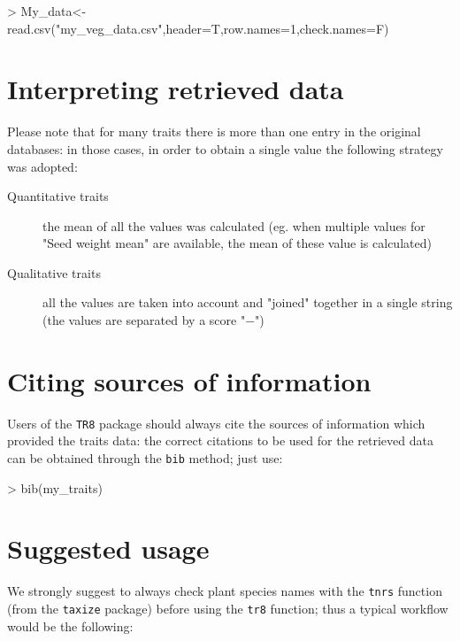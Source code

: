 \documentclass{article}
\begin{document}
\begin{Schunk}
\begin{Sinput}
> My_data<-read.csv("my_veg_data.csv",header=T,row.names=1,check.names=F)
\end{Sinput}
\end{Schunk}


\section{Interpreting retrieved data}
\label{sec:interpreting}

Please note that for many traits there is more than one entry in the
original databases: in those cases, in order to obtain a single value
the following strategy was adopted:

\begin{description}
\item[Quantitative traits] the mean of all the values was calculated
  (eg. when multiple values for "Seed weight mean" are available, the
  mean of these value is calculated)
\item[Qualitative traits] all the values are taken into account and
  "joined" together in a single string (the values are separated by a
  score "$-$")
\end{description}
\section{Citing sources of information}
\label{sec:citing}

  Users of the \texttt{TR8} package should always cite the sources of information which provided the traits data: the correct citations to be used for the retrieved data can be obtained through the \texttt{bib} method; just use:
  

\begin{Schunk}
\begin{Sinput}
> bib(my_traits)
\end{Sinput}
\end{Schunk}

  
  
 \section{Suggested usage}

  We strongly suggest to always check plant species names with the
  \texttt{tnrs} function (from the \texttt{taxize} package) before
  using the \texttt{tr8} function; thus a typical workflow would be
  the following:
  
\end{document}
